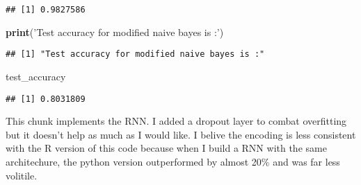 \documentclass[]{article}
\newenvironment{Shaded}{\begin{snugshade}}{\end{snugshade}}
\newcommand{\KeywordTok}[1]{\textcolor[rgb]{0.13,0.29,0.53}{\textbf{#1}}}
\newcommand{\NormalTok}[1]{#1}
\newcommand{\StringTok}[1]{\textcolor[rgb]{0.31,0.60,0.02}{#1}}
\begin{document}
\begin{verbatim}
## [1] 0.9827586
\end{verbatim}

\begin{Shaded}
\begin{Highlighting}[]
\KeywordTok{print}\NormalTok{(}\StringTok{'Test accuracy for modified naive bayes is :'}\NormalTok{)}
\end{Highlighting}
\end{Shaded}

\begin{verbatim}
## [1] "Test accuracy for modified naive bayes is :"
\end{verbatim}

\begin{Shaded}
\begin{Highlighting}[]
\NormalTok{test_accuracy}
\end{Highlighting}
\end{Shaded}

\begin{verbatim}
## [1] 0.8031809
\end{verbatim}

This chunk implements the RNN. I added a dropout layer to combat
overfitting but it doesn't help as much as I would like. I belive the
encoding is less consistent with the R version of this code because when
I build a RNN with the same architechure, the python version
outperformed by almost 20\% and was far less volitile.
\end{document}
